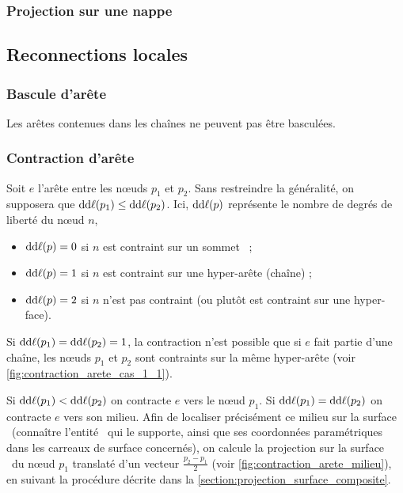 \subsubsection{Projection sur une nappe}




\subsection{Reconnections locales}
\subsubsection{Bascule d'arête}
Les arêtes contenues dans les chaînes ne peuvent pas être basculées.

\subsubsection{Contraction d'arête}
Soit $e$ l'arête entre les n\oe uds $p_1$ et $p_2$. Sans restreindre la généralité, on supposera que $\mathrm{dd}\ell(p_1) \leq 
\mathrm{dd}\ell(p_2)$.
Ici, $\mathrm{dd}\ell(p)$ représente le nombre de degrés de liberté du n\oe ud $n$, \ie 
\begin{itemize}
	\item $\mathrm{dd}\ell(p) = 0$ si $n$ est contraint sur un sommet \brep\ ;
	\item $\mathrm{dd}\ell(p) = 1$ si $n$ est contraint sur une hyper-arête (chaîne) ;
	\item $\mathrm{dd}\ell(p) = 2$ si $n$ n'est pas contraint (ou plutôt est contraint sur une hyper-face).
\end{itemize}
Si $\mathrm{dd}\ell(p_1) = \mathrm{dd}\ell(p_2) = 1$, la contraction n'est possible que si $e$ fait partie d'une chaîne, \ie les n\oe uds $p_1$ et $p_2$ sont contraints sur la même hyper-arête (voir \autoref{fig:contraction_arete_cas_1_1}).



Si $\mathrm{dd}\ell(p_1) < \mathrm{dd}\ell(p_2)$ on contracte $e$ vers le n\oe ud $p_1$. 
Si $\mathrm{dd}\ell(p_1) = \mathrm{dd}\ell(p_2)$ on contracte $e$ vers son milieu. Afin de localiser précisément ce milieu sur la surface \brep\ (\ie connaître l'entité \brep\ qui le supporte, ainsi que ses coordonnées paramétriques dans les carreaux de surface concernés), on calcule la projection sur la surface \brep\ du n\oe ud $p_1$ translaté d'un vecteur $\frac{p_2 - p_1}{2}$ (voir \autoref{fig:contraction_arete_milieu}), en suivant la procédure décrite dans la \autoref{section:projection_surface_composite}.

